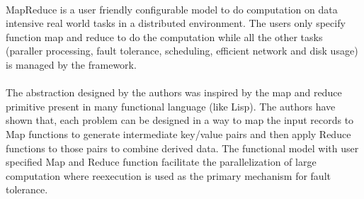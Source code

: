 \documentclass{article}
\begin{document}
\paragraph{}
MapReduce is a user friendly configurable model to do computation on data intensive real world tasks in a distributed environment. 
The users only specify function map and reduce to do the computation while all the other tasks (paraller processing, fault tolerance, 
scheduling, efficient network and disk usage) is managed by the framework.

\paragraph{}
The abstraction designed by the authors was inspired by the map and reduce primitive present in many functional language (like Lisp). 
The authors have shown that, each problem can be designed in a way to map the input records to Map functions to generate intermediate 
key/value pairs and then apply Reduce functions to those pairs to combine derived data. The functional model with user specified Map 
and Reduce function facilitate the parallelization of large computation where reexecution is used as the primary mechanism for fault 
tolerance.
\end{document}
